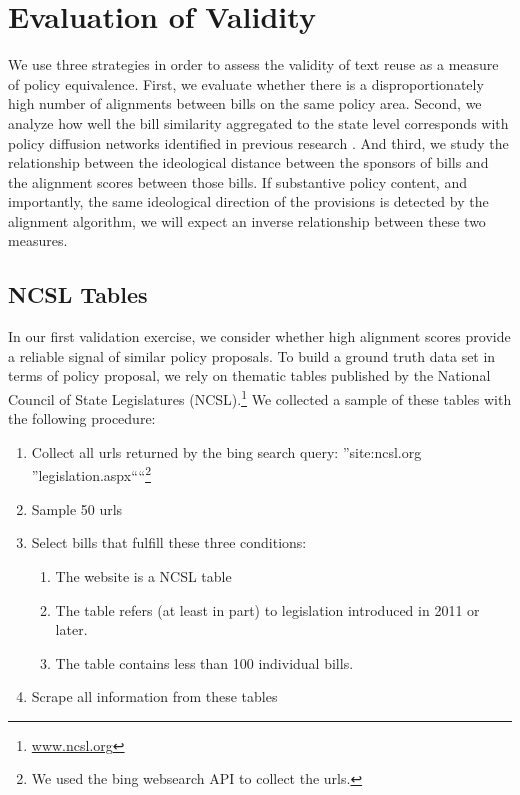 \documentclass[12pt]{article} %
\begin{document}
\section{Evaluation of Validity}

We use three strategies in order to assess the validity of text reuse as a measure of policy equivalence. First, we evaluate whether there is a disproportionately high number of alignments between bills on the same policy area. Second, we analyze how well the bill similarity aggregated to the state level corresponds with policy diffusion networks identified in previous research \citep{desmarais2015}. And third, we study the relationship between the ideological distance between the sponsors of bills and the alignment scores between those bills. If substantive policy content, and importantly, the same ideological direction of the provisions is detected by the alignment algorithm, we will expect an inverse relationship between these two measures.


\subsection{NCSL Tables}

In our first validation exercise, we consider whether high alignment scores provide a reliable signal of similar policy proposals. To build a ground truth data set in terms of policy proposal, we rely on thematic tables published by the National Council of State Legislatures (NCSL).\footnote{\url{www.ncsl.org}}  We collected a sample of these tables with the following procedure:

\begin{singlespacing}

\begin{enumerate}
    \item Collect all urls returned by the bing search query: ''site:ncsl.org ''legislation.aspx````\footnote{We used the bing websearch API to collect the urls.}
    \item Sample 50 urls
    \item Select bills that fulfill these three conditions:
        \begin{enumerate}
            \item The website is a NCSL table
            \item The table refers (at least in part) to legislation introduced in 2011 or later.             \item The table contains less than 100 individual bills. 
        \end{enumerate}
    \item Scrape all information from these tables
\end{enumerate}

\end{singlespacing}
\end{document}
